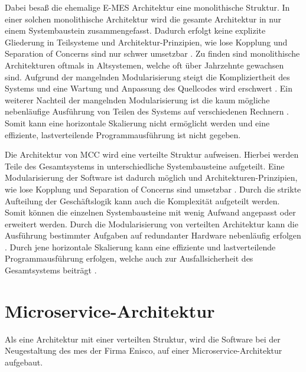 Dabei besaß die ehemalige E-MES Architektur eine monolithische Struktur. In einer solchen monolithische Architektur wird die gesamte Architektur in nur einem Systembaustein zusammengefasst. Dadurch erfolgt keine explizite Gliederung in Teilsysteme und Architektur-Prinzipien, wie lose Kopplung und Separation of Concerns sind nur schwer umsetzbar \cite{Vogel.2009}. Zu finden sind monolithische Architekturen oftmals in Altsystemen, welche oft über Jahrzehnte gewachsen sind. Aufgrund der mangelnden Modularisierung steigt die Kompliziertheit des Systems und eine Wartung und Anpassung des Quellcodes wird erschwert \cite{Prof.Dr.AndreasFink.2012b}. Ein weiterer Nachteil der mangelnden Modularisierung ist die kaum mögliche nebenläufige Ausführung von Teilen des Systems auf verschiedenen Rechnern \cite{Prof.Dr.AndreasFink.2012b}. Somit kann eine horizontale Skalierung nicht ermöglicht werden und eine effiziente, lastverteilende Programmausführung ist nicht gegeben.

Die Architektur von MCC wird eine verteilte Struktur aufweisen. Hierbei werden Teile des Gesamtsystems in unterschiedliche Systembausteine aufgeteilt. Eine Modularisierung der Software ist dadurch möglich und Architekturen-Prinzipien, wie lose Kopplung und Separation of Concerns sind umsetzbar \cite{Vogel.2009}. Durch die strikte Aufteilung der Geschäftslogik kann auch die Komplexität aufgeteilt werden. Somit können die einzelnen Systembausteine mit wenig Aufwand angepasst oder erweitert werden. Durch die Modularisierung von verteilten Architektur kann die Ausführung bestimmter Aufgaben auf redundanter Hardware nebenläufig erfolgen \cite{Prof.Dr.AndreasFink.2012}. Durch jene horizontale Skalierung kann eine effiziente und lastverteilende Programmausführung erfolgen, welche auch zur Ausfallsicherheit des Gesamtsystems beiträgt \cite{Prof.Dr.AndreasFink.2012}.


\section{Microservice-Architektur\label{sec2.2:Unterpunkt-2}}

Als eine Architektur mit einer verteilten Struktur, wird die Software bei der Neugestaltung des \gls{mes} der Firma Enisco, auf einer Microservice-Architektur aufgebaut.

